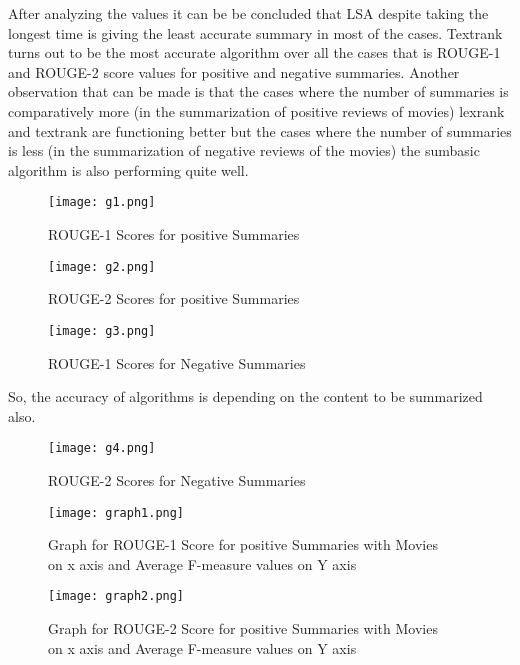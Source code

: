 \documentclass[conference]{IEEEtran}
\begin{document}
After analyzing the values it can be be concluded that LSA despite taking the longest time is giving the least accurate summary in most of the cases. Textrank turns out to be the most accurate algorithm over all the cases that is ROUGE-1 and ROUGE-2 score values for positive and negative summaries. Another observation that can be made is that the cases where the number of summaries is comparatively more (in the summarization of positive reviews of movies) lexrank and textrank are functioning better but the cases where the number of summaries is less (in the summarization of negative reviews of the movies) the sumbasic algorithm is also performing quite well. 

\begin{figure}[h!]
  \texttt{[image: g1.png]}
  \caption{ROUGE-1 Scores for positive Summaries}
  \label{fig:boat1}
\end{figure}

\begin{figure}[h!]
  \texttt{[image: g2.png]}
  \caption{ROUGE-2 Scores for positive Summaries}
  \label{fig:boat1}
\end{figure}

\begin{figure}[h!]
  \texttt{[image: g3.png]}
  \caption{ROUGE-1 Scores for Negative Summaries}
  \label{fig:boat1}
\end{figure}

So, the accuracy of algorithms is depending on the content to be summarized also.
 

\begin{figure}[h!]
  \texttt{[image: g4.png]}
  \caption{ROUGE-2 Scores for Negative Summaries}
  \label{fig:boat1}
\end{figure}

\begin{figure}[h!]
  \texttt{[image: graph1.png]}
  \caption{Graph for ROUGE-1 Score for positive Summaries with Movies \\ on x axis and 
   Average F-measure values on Y axis}
  \label{fig:boat1}
\end{figure}

\begin{figure}[h!]
  \texttt{[image: graph2.png]}
  \caption{Graph for ROUGE-2 Score for positive Summaries with Movies \\ on x axis and 
   Average F-measure values on Y axis}
  \label{fig:boat1}
\end{figure}
\end{document}
